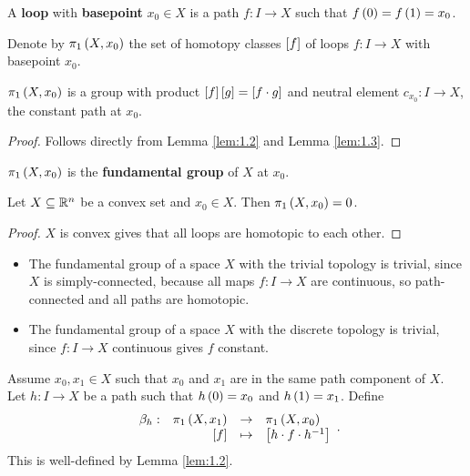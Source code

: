 \begin{definition*}
A \textbf{loop} with \textbf{basepoint} $ x_0 \in X $ is a path $ f : I \to X $ such that $ f\rb{0} = f\rb{1} = x_0 $.
\end{definition*}

\begin{definition*}
Denote by $ \pi_1\rb{X, x_0} $ the set of homotopy classes $ \sb{f} $ of loops $ f : I \to X $ with basepoint $ x_0 $.
\end{definition*}

\begin{proposition}
$ \pi_1\rb{X, x_0} $ is a group with product $ \sb{f}\sb{g} = \sb{f \cdot g} $ and neutral element $ c_{x_0} : I \to X $, the constant path at $ x_0 $.
\end{proposition}

\begin{proof}
Follows directly from Lemma \ref{lem:1.2} and Lemma \ref{lem:1.3}.
\end{proof}

\begin{definition*}
$ \pi_1\rb{X, x_0} $ is the \textbf{fundamental group} of $ X $ at $ x_0 $.
\end{definition*}

\begin{example*}
Let $ X \subseteq \R^n $ be a convex set and $ x_0 \in X $. Then $ \pi_1\rb{X, x_0} = 0 $.
\end{example*}

\begin{proof}
$ X $ is convex gives that all loops are homotopic to each other.
\end{proof}

\begin{example*}
\hfill
\begin{itemize}
\item The fundamental group of a space $ X $ with the trivial topology is trivial, since $ X $ is simply-connected, because all maps $ f : I \to X $ are continuous, so path-connected and all paths are homotopic.
\item The fundamental group of a space $ X $ with the discrete topology is trivial, since $ f : I \to X $ continuous gives $ f $ constant.
\end{itemize}
\end{example*}

Assume $ x_0, x_1 \in X $ such that $ x_0 $ and $ x_1 $ are in the same path component of $ X $. Let $ h : I \to X $ be a path such that $ h\rb{0} = x_0 $ and $ h\rb{1} = x_1 $. Define
$$ \function[\beta_h]{\pi_1\rb{X, x_1}}{\pi_1\rb{X, x_0}}{\sb{f}}{\sb{h \cdot f \cdot h^{-1}}}. $$
This is well-defined by Lemma \ref{lem:1.2}.

